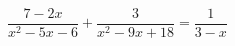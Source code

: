 \begin{ex}[type=equation]
	\begin{condition}
		$\dfrac{7-2x}{x^2 - 5x - 6}+\dfrac{3}{x^2 - 9x + 18} = \dfrac{1}{3 - x}$
	\end{condition}
\end{ex}